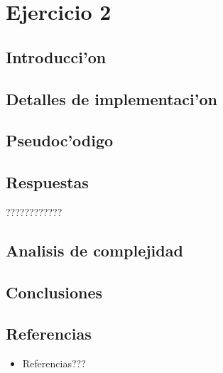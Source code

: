 \newpage
\section{Ejercicio 2}

\subsection{Introducci'on}


\subsection{Detalles de implementaci'on}


\subsection{Pseudoc'odigo}


\subsection{Respuestas}
????????????

\subsection{Analisis de complejidad}


\subsection{Conclusiones}


\subsection{Referencias}
\begin{itemize}
    \item Referencias???
\end{itemize}

